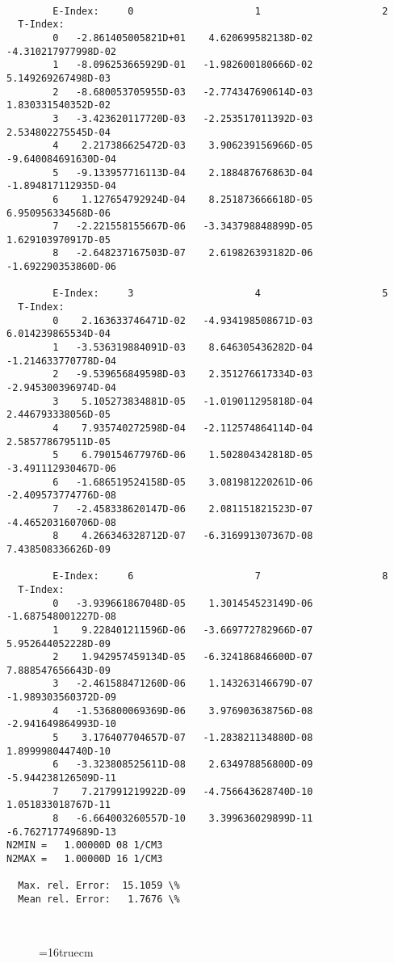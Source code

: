 \documentclass[12pt,dvipdfmx]{article}
\begin{document}
\begin{small}\begin{verbatim}

        E-Index:     0                     1                     2
  T-Index:
        0   -2.861405005821D+01    4.620699582138D-02   -4.310217977998D-02
        1   -8.096253665929D-01   -1.982600180666D-02    5.149269267498D-03
        2   -8.680053705955D-03   -2.774347690614D-03    1.830331540352D-02
        3   -3.423620117720D-03   -2.253517011392D-03    2.534802275545D-04
        4    2.217386625472D-03    3.906239156966D-05   -9.640084691630D-04
        5   -9.133957716113D-04    2.188487676863D-04   -1.894817112935D-04
        6    1.127654792924D-04    8.251873666618D-05    6.950956334568D-06
        7   -2.221558155667D-06   -3.343798848899D-05    1.629103970917D-05
        8   -2.648237167503D-07    2.619826393182D-06   -1.692290353860D-06

        E-Index:     3                     4                     5
  T-Index:
        0    2.163633746471D-02   -4.934198508671D-03    6.014239865534D-04
        1   -3.536319884091D-03    8.646305436282D-04   -1.214633770778D-04
        2   -9.539656849598D-03    2.351276617334D-03   -2.945300396974D-04
        3    5.105273834881D-05   -1.019011295818D-04    2.446793338056D-05
        4    7.935740272598D-04   -2.112574864114D-04    2.585778679511D-05
        5    6.790154677976D-06    1.502804342818D-05   -3.491112930467D-06
        6   -1.686519524158D-05    3.081981220261D-06   -2.409573774776D-08
        7   -2.458338620147D-06    2.081151821523D-07   -4.465203160706D-08
        8    4.266346328712D-07   -6.316991307367D-08    7.438508336626D-09

        E-Index:     6                     7                     8
  T-Index:
        0   -3.939661867048D-05    1.301454523149D-06   -1.687548001227D-08
        1    9.228401211596D-06   -3.669772782966D-07    5.952644052228D-09
        2    1.942957459134D-05   -6.324186846600D-07    7.888547656643D-09
        3   -2.461588471260D-06    1.143263146679D-07   -1.989303560372D-09
        4   -1.536800069369D-06    3.976903638756D-08   -2.941649864993D-10
        5    3.176407704657D-07   -1.283821134880D-08    1.899998044740D-10
        6   -3.323808525611D-08    2.634978856800D-09   -5.944238126509D-11
        7    7.217991219922D-09   -4.756643628740D-10    1.051833018767D-11
        8   -6.664003260557D-10    3.399636029899D-11   -6.762717749689D-13
N2MIN =   1.00000D 08 1/CM3
N2MAX =   1.00000D 16 1/CM3

  Max. rel. Error:  15.1059 \%
  Mean rel. Error:   1.7676 \%



\end{verbatim}\end{small}
\begin{figure} \label{2.1.8a}
\epsfxsize=16truecm
\end{figure}
\newpage
\end{document}
